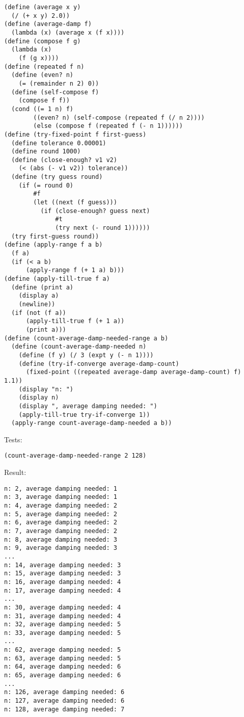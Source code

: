 \documentclass[../main.tex]{subfiles}
\begin{document}
\begin{lstlisting}
(define (average x y)
  (/ (+ x y) 2.0))
(define (average-damp f)
  (lambda (x) (average x (f x))))
(define (compose f g)
  (lambda (x)
    (f (g x))))
(define (repeated f n)
  (define (even? n)
    (= (remainder n 2) 0))
  (define (self-compose f)
    (compose f f))
  (cond ((= 1 n) f)
        ((even? n) (self-compose (repeated f (/ n 2))))
        (else (compose f (repeated f (- n 1))))))
(define (try-fixed-point f first-guess)
  (define tolerance 0.00001)
  (define round 1000)
  (define (close-enough? v1 v2)
    (< (abs (- v1 v2)) tolerance))
  (define (try guess round)
    (if (= round 0)
        #f
        (let ((next (f guess)))
          (if (close-enough? guess next)
              #t
              (try next (- round 1))))))
  (try first-guess round))
(define (apply-range f a b)
  (f a)
  (if (< a b)
      (apply-range f (+ 1 a) b)))
(define (apply-till-true f a)
  (define (print a)
    (display a)
    (newline))
  (if (not (f a))
      (apply-till-true f (+ 1 a))
      (print a)))
(define (count-average-damp-needed-range a b)
  (define (count-average-damp-needed n)
    (define (f y) (/ 3 (expt y (- n 1))))
    (define (try-if-converge average-damp-count)
      (fixed-point ((repeated average-damp average-damp-count) f) 1.1))
    (display "n: ")
    (display n)
    (display ", average damping needed: ")
    (apply-till-true try-if-converge 1))
  (apply-range count-average-damp-needed a b))
\end{lstlisting}

Tests:

\begin{lstlisting}
(count-average-damp-needed-range 2 128)
\end{lstlisting}

Result:

\begin{lstlisting}
n: 2, average damping needed: 1
n: 3, average damping needed: 1
n: 4, average damping needed: 2
n: 5, average damping needed: 2
n: 6, average damping needed: 2
n: 7, average damping needed: 2
n: 8, average damping needed: 3
n: 9, average damping needed: 3
...
n: 14, average damping needed: 3
n: 15, average damping needed: 3
n: 16, average damping needed: 4
n: 17, average damping needed: 4
...
n: 30, average damping needed: 4
n: 31, average damping needed: 4
n: 32, average damping needed: 5
n: 33, average damping needed: 5
...
n: 62, average damping needed: 5
n: 63, average damping needed: 5
n: 64, average damping needed: 6
n: 65, average damping needed: 6
...
n: 126, average damping needed: 6
n: 127, average damping needed: 6
n: 128, average damping needed: 7
\end{lstlisting}
\end{document}

